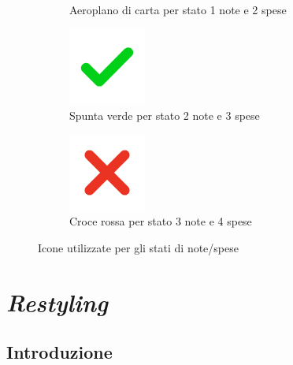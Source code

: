 \begin{figure}[H]
\begin{subfigure}[t]{.18\textwidth}
        \caption{Aeroplano di carta per stato 1 note e 2 spese}
    \end{subfigure} \hspace{1.2mm}
    \begin{subfigure}[t]{.18\textwidth}
        \centering
        \includegraphics[width=.5\columnwidth]{images/icons/icon_green_check.png}
        \caption{Spunta verde per stato 2 note e 3 spese}
    \end{subfigure} \hspace{1.2mm}
    \begin{subfigure}[t]{.18\textwidth}
        \centering
        \includegraphics[width=.5\columnwidth]{images/icons/icon_red_cross.png}
        \caption{Croce rossa per stato 3 note e 4 spese}
    \end{subfigure} \hspace{1.2mm}
    \caption{Icone utilizzate per gli stati di note/spese}
\end{figure}

\section{\textit{Restyling}}

\subsection{Introduzione}

